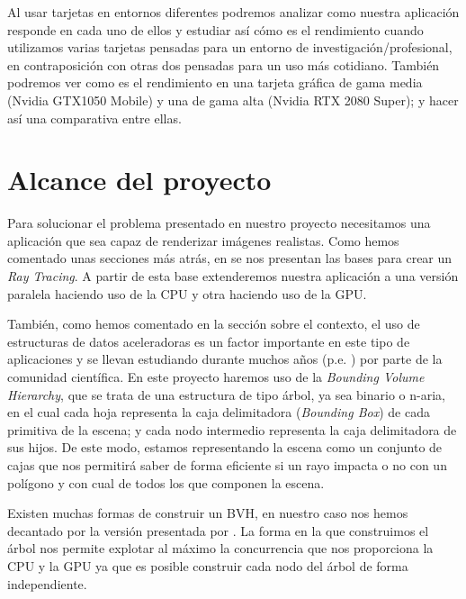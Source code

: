 \documentclass[titlepage,12pt]{report}
\begin{document}
Al usar tarjetas en entornos diferentes podremos analizar como nuestra aplicación responde en cada uno de ellos y estudiar así cómo es el rendimiento cuando utilizamos varias tarjetas pensadas para un entorno de investigación/profesional, en contraposición con otras dos pensadas para un uso más cotidiano. También podremos ver como es el rendimiento en una tarjeta gráfica de gama media (Nvidia GTX1050 Mobile) y una de gama alta (Nvidia RTX 2080 Super); y hacer así una comparativa entre ellas.

\section{Alcance del proyecto}

Para solucionar el problema presentado en nuestro proyecto necesitamos una aplicación que sea capaz de renderizar imágenes realistas. Como hemos comentado unas secciones más atrás, en \citep{ShirleyRTA, ShirleyRTB, ShirleyRTC} se nos presentan las bases para crear un \textit{Ray Tracing}. A partir de esta base extenderemos nuestra aplicación a una versión paralela haciendo uso de la CPU y otra haciendo uso de la GPU.

También, como hemos comentado en la sección sobre el contexto, el uso de estructuras de datos aceleradoras es un factor importante en este tipo de aplicaciones y se llevan estudiando durante muchos años (p.e. \citep{Rubin1980}) por parte de la comunidad científica. En este proyecto haremos uso de la \textit{Bounding Volume Hierarchy}, que se trata de una estructura de tipo árbol, ya sea binario o n-aria, en el cual cada hoja representa la caja delimitadora (\textit{Bounding Box}) de cada primitiva de la escena; y cada nodo intermedio representa la caja delimitadora de sus hijos. De este modo, estamos representando la escena como un conjunto de cajas que nos permitirá saber de forma eficiente si un rayo impacta o no con un polígono y con cual de todos los que componen la escena.

Existen muchas formas de construir un BVH, en nuestro caso nos hemos decantado por la versión presentada por \citep{Karras2012, Karras2013}. La forma en la que construimos el árbol nos permite explotar al máximo la concurrencia que nos proporciona la CPU y la GPU ya que es posible construir cada nodo del árbol de forma independiente.
\end{document}
